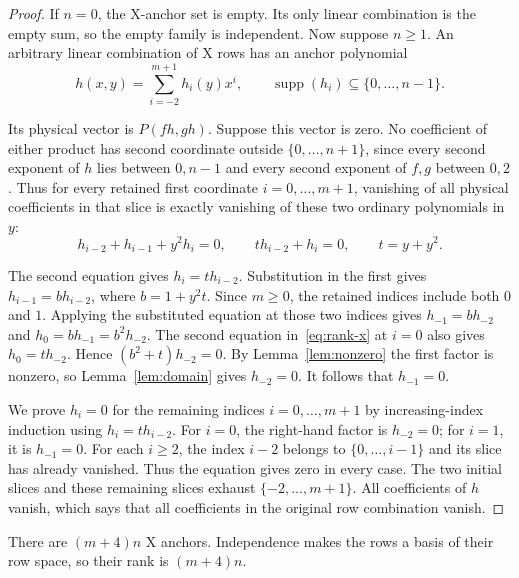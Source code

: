 \documentclass{article}
\begin{document}
\begin{proof}
If \(n=0\), the X-anchor set is empty. Its only linear combination is
the empty sum, so the empty family is independent. Now suppose \(n\ge 1\).
An arbitrary linear combination of X rows has an anchor polynomial
\begin{equation}\label{eq:x-anchor-polynomial}
 h(x,y)=\sum_{i=-2}^{m+1} h_i(y)x^i,
 \qquad \operatorname{supp}(h_i)\subseteq\{0,\ldots,n-1\}.
\end{equation}

Its physical vector is \(P(fh,gh)\). Suppose this vector is zero. No coefficient
of either product has second coordinate outside \(\{0,\ldots,n+1\}\), since every
second exponent of \(h\) lies between \(0,n-1\) and every second exponent of
\(f,g\) between \(0,2\). Thus for every retained first coordinate \(i=0,\ldots,m+1\),
vanishing of all physical coefficients in that slice is exactly vanishing
of these two ordinary polynomials in \(y\):
\begin{equation}\label{eq:rank-x}
 h_{i-2}+h_{i-1}+y^2h_i=0,
 \qquad t h_{i-2}+h_i=0,
 \qquad t=y+y^2.
\end{equation}

The second equation gives \(h_i=t h_{i-2}\). Substitution in the first gives
\(h_{i-1}=b h_{i-2}\), where \(b=1+y^2t\). Since \(m\ge 0\), the retained indices
include both \(0\) and \(1\). Applying the substituted equation at those two indices
gives \(h_{-1}=b h_{-2}\) and \(h_0=b h_{-1}=b^2h_{-2}\). The second equation
in~\eqref{eq:rank-x} at \(i=0\) also gives \(h_0=t h_{-2}\). Hence
\((b^2+t)h_{-2}=0\). By Lemma~\ref{lem:nonzero} the first factor is nonzero, so
Lemma~\ref{lem:domain} gives \(h_{-2}=0\). It follows that \(h_{-1}=0\).

We prove \(h_i=0\) for the remaining indices \(i=0,\ldots,m+1\) by increasing-index
induction using \(h_i=t h_{i-2}\). For \(i=0\), the right-hand factor is \(h_{-2}=0\);
for \(i=1\), it is \(h_{-1}=0\). For each \(i\ge 2\), the index \(i-2\) belongs to
\(\{0,\ldots,i-1\}\) and its slice has already vanished. Thus the equation gives zero
in every case. The two initial slices and these remaining slices exhaust
\(\{-2,\ldots,m+1\}\). All coefficients of \(h\) vanish, which says that all
coefficients in the original row combination vanish.
\end{proof}

There are \((m+4)n\) X anchors. Independence makes the rows a basis of their row
space, so their rank is \((m+4)n\).
\end{document}
